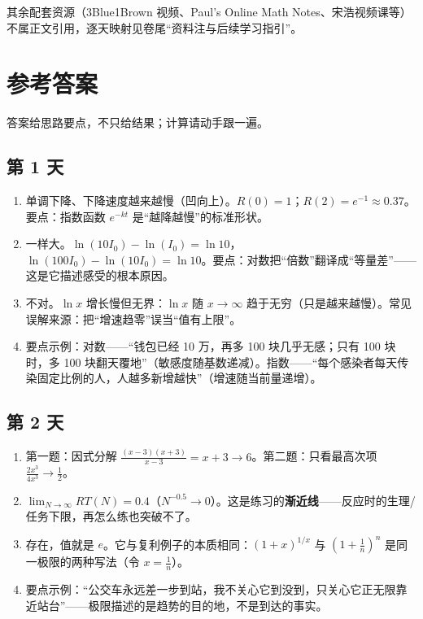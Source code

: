 \documentclass[UTF8,a4paper,11pt]{ctexart}
\begin{document}
其余配套资源（3Blue1Brown 视频、Paul's Online Math Notes、宋浩视频课等）不属正文引用，逐天映射见卷尾“资料注与后续学习指引”。

\newpage

\section*{参考答案}

答案给思路要点，不只给结果；计算请动手跟一遍。

\subsection*{第 1 天}
\begin{enumerate}
  \item 单调下降、下降速度越来越慢（凹向上）。$R(0)=1$；$R(2)=e^{-1}\approx0.37$。要点：指数函数 $e^{-kt}$ 是“越降越慢”的标准形状。
  \item 一样大。$\ln(10I_0)-\ln(I_0)=\ln10$，$\ln(100I_0)-\ln(10I_0)=\ln10$。要点：对数把“倍数”翻译成“等量差”——这是它描述感受的根本原因。
  \item 不对。$\ln x$ 增长慢但无界：$\ln x$ 随 $x\to\infty$ 趋于无穷（只是越来越慢）。常见误解来源：把“增速趋零”误当“值有上限”。
  \item 要点示例：对数——“钱包已经 10 万，再多 100 块几乎无感；只有 100 块时，多 100 块翻天覆地”（敏感度随基数递减）。指数——“每个感染者每天传染固定比例的人，人越多新增越快”（增速随当前量递增）。
\end{enumerate}

\subsection*{第 2 天}
\begin{enumerate}
  \item 第一题：因式分解 $\tfrac{(x-3)(x+3)}{x-3}=x+3\to 6$。第二题：只看最高次项 $\tfrac{2x^3}{4x^3}\to\tfrac12$。
  \item $\lim_{N\to\infty}RT(N)=0.4$（$N^{-0.5}\to0$）。这是练习的\textbf{渐近线}——反应时的生理/任务下限，再怎么练也突破不了。
  \item 存在，值就是 $e$。它与复利例子的本质相同：$(1+x)^{1/x}$ 与 $(1+\tfrac1n)^n$ 是同一极限的两种写法（令 $x=\tfrac1n$）。
  \item 要点示例：“公交车永远差一步到站，我不关心它到没到，只关心它正无限靠近站台”——极限描述的是趋势的目的地，不是到达的事实。
\end{enumerate}
\end{document}
